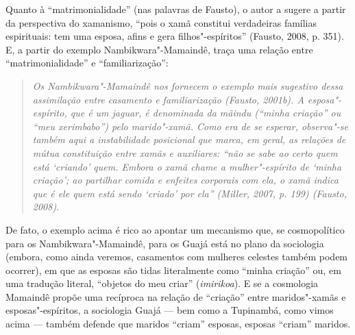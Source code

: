 Quanto à ``matrimonialidade'' (nas palavras de Fausto), o autor a sugere a
partir da perspectiva do xamanismo, ``pois o xamã constitui verdadeiras
famílias espirituais: tem uma esposa, afins e gera filhos"-espíritos''
(Fausto, 2008, p. 351). E, a partir do exemplo Nambikwara"-Mamaindê, traça
uma relação entre ``matrimonialidade'' e ``familiarização'':

\begin{quote}
\emph{Os Nambikwara"-Mamaindê nos fornecem o exemplo mais sugestivo dessa
assimilação entre casamento e familiarização (Fausto, 2001b). A
esposa"-espírito, que é um jaguar, é denominada da \emph{mãindu} (``minha
criação'' ou ``meu xerimbabo'') pelo marido"-xamã. Como era de se
esperar, observa"-se também aqui a instabilidade posicional que marca, em
geral, as relações de mútua constituição entre xamãs e auxiliares: ``não
se sabe ao certo quem está `criando' quem. Embora o xamã chame a
mulher"-espírito de `minha criação'; ao partilhar comida e enfeites
corporais com ela, o xamã indica que é ele quem está sendo `criado' por
ela'' (Miller, 2007, p. 199) (Fausto, 2008)}.
\end{quote}

De fato, o exemplo acima é rico ao apontar um mecanismo que, se
cosmopolítico para os Nambikwara"-Mamaindê, para os Guajá está no plano
da sociologia (embora, como ainda veremos, casamentos com mulheres
celestes também podem ocorrer), em que as esposas são tidas literalmente
como ``minha criação'' ou, em uma tradução literal, ``objetos do meu criar''
(\emph{imirikoa}). E se a cosmologia Mamaindê propõe uma recíproca na
relação de ``criação'' entre maridos"-xamãs e esposas"-espíritos, a
sociologia Guajá --- bem como a Tupinambá, como vimos acima --- também
defende que maridos ``criam'' esposas, esposas ``criam'' maridos.


